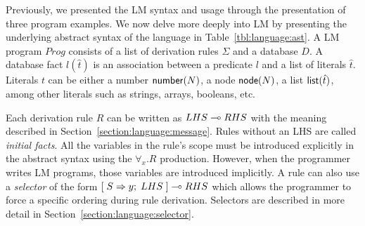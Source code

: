 Previously, we presented the LM syntax and usage through the presentation of
three program examples. We now delve more deeply into LM by presenting the
underlying abstract syntax of the language in Table~\ref{tbl:language:ast}. A LM
program $Prog$ consists of a list of derivation rules $\Sigma$ and a database
$D$. A database fact $l(\hat{t})$ is an association between a predicate $l$ and
a list of literals $\hat{t}$. Literals $t$ can be either a number
$\mathsf{number}(N)$, a node $\mathsf{node}(N)$, a list $\mathsf{list}(\hat{t})$, among other
literals such as strings, arrays, booleans, etc.

Each derivation rule $R$ can be written as $LHS \multimap RHS$ with the meaning
described in Section~\ref{section:language:message}. Rules without an LHS are
called \emph{initial facts}. All the variables in the rule's scope must be
introduced explicitly in the abstract syntax using the $\forall_x. R$
production. However, when the programmer writes LM programs, those variables are
introduced implicitly. A rule can also use a \emph{selector} of the form
$[\; S \Rightarrow y; \; LHS \;] \multimap RHS$ which allows the programmer to force a specific
ordering during rule derivation. Selectors are described in more detail in
Section~\ref{section:language:selector}.

\newcommand{\sop}[0]{\Vert}

